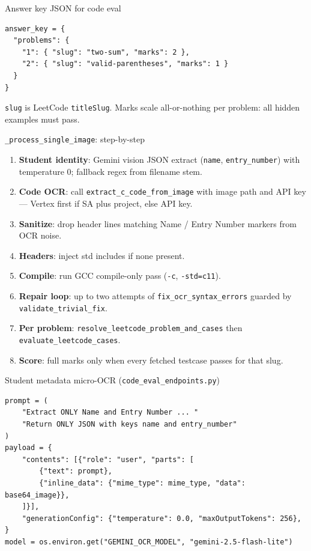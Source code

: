 \documentclass[aspectratio=169]{beamer}
\begin{document}
\begin{frame}[fragile]{Answer key JSON for code eval}
\begin{lstlisting}[style=pys]
answer_key = {
  "problems": {
    "1": { "slug": "two-sum", "marks": 2 },
    "2": { "slug": "valid-parentheses", "marks": 1 }
  }
}
\end{lstlisting}
\vfill
\tiny \texttt{slug} is LeetCode \texttt{titleSlug}. Marks scale all-or-nothing per problem: all hidden examples must pass.
\end{frame}

\begin{frame}{\texttt{\_process\_single\_image}: step-by-step}
  \footnotesize
  \begin{enumerate}
    \item \textbf{Student identity}: Gemini vision JSON extract (\texttt{name}, \texttt{entry\_number}) with temperature 0; fallback regex from filename stem.
    \item \textbf{Code OCR}: call \texttt{extract\_c\_code\_from\_image} with image path and API key --- Vertex first if SA plus project, else API key.
    \item \textbf{Sanitize}: drop header lines matching Name / Entry Number markers from OCR noise.
    \item \textbf{Headers}: inject std includes if none present.
    \item \textbf{Compile}: run GCC compile-only pass (\texttt{-c}, \texttt{-std=c11}).
    \item \textbf{Repair loop}: up to two attempts of \texttt{fix\_ocr\_syntax\_errors} guarded by \texttt{validate\_trivial\_fix}.
    \item \textbf{Per problem}: \texttt{resolve\_leetcode\_problem\_and\_cases} then \texttt{evaluate\_leetcode\_cases}.
    \item \textbf{Score}: full marks only when every fetched testcase passes for that slug.
  \end{enumerate}
\end{frame}

\begin{frame}[fragile]{Student metadata micro-OCR (\texttt{code\_eval\_endpoints.py})}
\begin{lstlisting}[style=py]
prompt = (
    "Extract ONLY Name and Entry Number ... "
    "Return ONLY JSON with keys name and entry_number"
)
payload = {
    "contents": [{"role": "user", "parts": [
        {"text": prompt},
        {"inline_data": {"mime_type": mime_type, "data": base64_image}},
    ]}],
    "generationConfig": {"temperature": 0.0, "maxOutputTokens": 256},
}
model = os.environ.get("GEMINI_OCR_MODEL", "gemini-2.5-flash-lite")
\end{lstlisting}
\end{frame}
\end{document}
